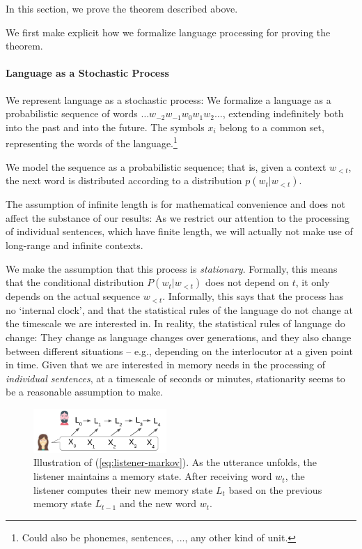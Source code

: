 In this section, we prove the theorem described above.

We first make explicit how we formalize language processing for proving the theorem.

\paragraph{Language as a Stochastic Process}
We represent language as a stochastic process:
We formalize a language as a probabilistic sequence of words $\dots w_{-2} w_{-1} w_0 w_{1} w_{2} \dots$, extending indefinitely both into the past and into the future.
The symbols $x_i$ belong to a common set, representing the words of the language.\footnote{Could also be phonemes, sentences, ..., any other kind of unit.}

We model the sequence as a probabilistic sequence; that is, given a context $w_{<t}$, the next word is distributed according to a distribution $p(w_t|w_{<t})$.

The assumption of infinite length is for mathematical convenience and does not affect the substance of our results:
As we restrict our attention to the processing of individual sentences, which have finite length, we will actually not make use of long-range and infinite contexts.

We make the assumption that this process is \emph{stationary}.
Formally, this means that the conditional distribution $P(w_t|w_{<t})$ does not depend on $t$, it only depends on the actual sequence $w_{<t}$.
Informally, this says that the process has no `internal clock', and that the statistical rules of the language do not change at the timescale we are interested in.
In reality, the statistical rules of language do change: They change as language changes over generations, and they also change between different situations -- e.g., depending on the interlocutor at a given point in time.
Given that we are interested in memory needs in the processing of \emph{individual sentences}, at a timescale of seconds or minutes, stationarity seems to be a reasonable assumption to make.





\begin{figure}
\includegraphics[width=0.45\textwidth]{figures/markov-condition.png}
	\caption{Illustration of (\ref{eq:listener-markov}). As the utterance unfolds, the listener maintains a memory state. After receiving word $w_t$, the listener computes their new memory state $L_t$ based on the previous memory state $L_{t-1}$ and the new word $w_t$.}\label{fig:listener-markov}
\end{figure}


